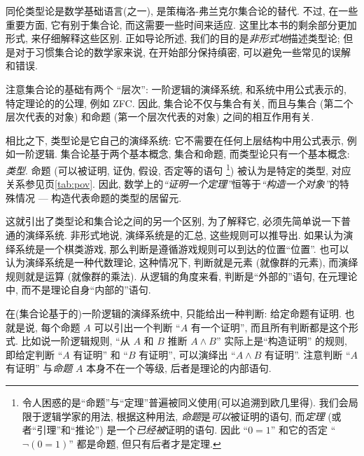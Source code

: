 \label{sec:axioms}

同伦类型论是数学基础语言(之一), 是策梅洛-弗兰克尔集合论的替代.
不过, 在一些重要方面, 它有别于集合论, 而这需要一些时间来适应.
这里比本书的剩余部分更加形式, 来仔细解释这些区别.
正如导论所述, 我们的目的是\emph{非形式地}描述类型论;
但是对于习惯集合论的数学家来说, 在开始部分保持缜密, 可以避免一些常见的误解和错误.

注意集合论的基础有两个 ``层次'': 一阶逻辑的演绎系统, 和系统中用公式表示的, 特定理论的的公理, 例如 ZFC.
因此, 集合论不仅与集合有关, 而且与集合 (第二个层次代表的对象) 和命题 (第一个层次代表的对象) 之间的相互作用有关.

相比之下, 类型论是它自己的演绎系统: 它不需要在任何上层结构中用公式表示, 例如一阶逻辑.
集合论基于两个基本概念, 集合和命题, 而类型论只有一个基本概念: \emph{类型}.
命题 (可以被证明, 证伪, 假设, 否定等的语句%
\footnote{令人困惑的是``命题''与``定理''普遍被同义使用(可以追溯到欧几里得).
我们会局限于逻辑学家的用法, 根据这种用法, \emph{命题}是\emph{可以}被证明的语句, 而\emph{定理}
%
(或者``引理''和``推论'')
是一个\emph{已经被}证明的语句.
因此 ``$0=1$'' 和它的否定 ``$\neg(0=1)$'' 都是命题, 但只有后者才是定理.})
被认为是特定的类型, 对应关系参见\pageref{tab:pov}页\cref{tab:pov}.
因此, 数学上的\emph{``证明一个定理''}恒等于\emph{``构造一个对象''}的特殊情况 --- 构造代表命题的类型的居留元.

%
这就引出了类型论和集合论之间的另一个区别, 为了解释它, 必须先简单说一下普通的演绎系统.
非形式地说, 演绎系统是的汇总,%
这些规则可以推导出. %
如果认为演绎系统是一个棋类游戏, %
那么判断是遵循游戏规则可以到达的位置``位置''.
也可以认为演绎系统是一种代数理论, 这种情况下, 判断就是元素 (就像群的元素), 而演绎规则就是运算 (就像群的乘法).
从逻辑的角度来看,  判断是``外部的''语句, 在元理论中, 而不是理论自身``内部的''语句.

在(集合论基于的)一阶逻辑的演绎系统中, 只能给出一种判断: 给定命题有证明.
也就是说, 每个命题 $A$ 可以引出一个判断 ``$A$ 有一个证明'', 而且所有判断都是这个形式.
比如说一阶逻辑规则, ``从 $A$ 和 $B$ 推断 $A\wedge B$'' 实际上是``构造证明'' 的规则, 即给定判断 ``$A$ 有证明'' 和 ``$B$ 有证明'', 可以演绎出 ``$A\wedge B$ 有证明''.
注意判断 ``$A$ 有证明'' 与\emph{命题} $A$ 本身不在一个等级, 后者是理论的内部语句.

